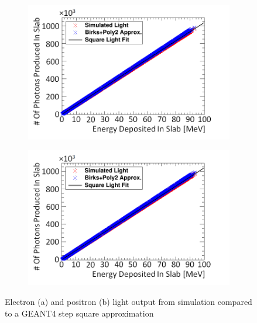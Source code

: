 \begin{figure}[!h]
\centering
\begin{subfigure}{.5\textwidth}
  \centering
  \includegraphics[width=\linewidth]{Chapter4/Figs/Raster/electronSimulatedLightBirksAndPoly2New.png}
  \captionsetup{width=.9\linewidth}
  \caption{}
  \label{subFig:square_electron_light}
\end{subfigure}%
\begin{subfigure}{.5\textwidth}
  \centering
  \includegraphics[width=\linewidth]{Chapter4/Figs/Raster/positronSimulatedLightBirksAndPoly2New.png}
  \captionsetup{width=.9\linewidth}
  \caption{}
  \label{subFig:square_positron_light}
\end{subfigure}
\caption{Electron (a) and positron (b) light output from simulation compared to a GEANT4 step square approximation}
\label{fig:square_electron_positron_light}
\end{figure}


